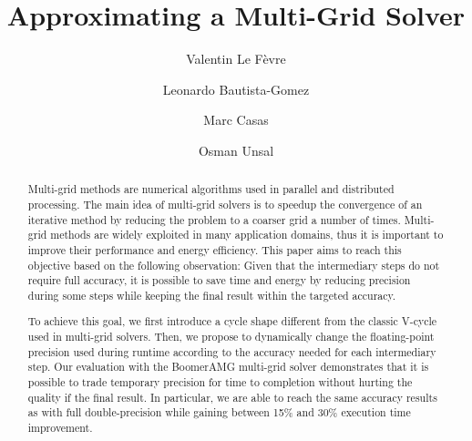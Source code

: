 \documentclass[sigconf]{acmart}
\title{Approximating a Multi-Grid Solver}
\author{Valentin Le F\`{e}vre}
\affiliation{\'{E}cole Normale Supérieure de Lyon}
\author{Leonardo Bautista-Gomez}
\affiliation{
        Barcelona Supercomputing Center}
\author{Marc Casas}
\affiliation{
        Barcelona Supercomputing Center}
\author{Osman Unsal}
\affiliation{
        Barcelona Supercomputing Center}
\begin{document}
\maketitle
\begin{abstract}

    Multi-grid methods are numerical algorithms used in parallel and
    distributed processing. The main idea of multi-grid solvers is to speedup
    the convergence of an iterative method by reducing the problem to a coarser
    grid a number of times. Multi-grid methods are widely exploited in many
    application domains, thus it is important to improve  their performance and
    energy efficiency. This paper aims to reach this objective based on the
    following observation: Given that the intermediary steps do not require
    full accuracy, it is possible to save time and energy by reducing precision
    during some steps while keeping the final result within the targeted
    accuracy.

    To achieve this goal, we first introduce a cycle shape different from
    the classic V-cycle used in multi-grid solvers.  Then, we propose to
    dynamically change the floating-point precision used during runtime
    according to the accuracy needed for each intermediary step. Our evaluation
    with the BoomerAMG multi-grid solver demonstrates that it is possible to
    trade temporary precision for time to completion without hurting the
    quality if the final result.  In particular, we are able to reach the same
    accuracy results as with full double-precision while gaining between 15\%
    and 30\% execution time improvement.

\end{abstract}



















\end{document}
